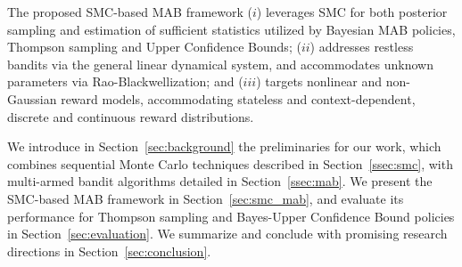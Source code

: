 The proposed SMC-based MAB framework 
($i$) leverages SMC for both posterior sampling and estimation of sufficient statistics utilized by Bayesian MAB policies,
\ie Thompson sampling and Upper Confidence Bounds; 
($ii$) addresses restless bandits via the general linear dynamical system, and accommodates unknown parameters via Rao-Blackwellization; and
($iii$) targets nonlinear and non-Gaussian reward models,
accommodating stateless and context-dependent, discrete and continuous reward distributions. 

We introduce in Section~\ref{sec:background} the preliminaries for our work,
which combines sequential Monte Carlo techniques described in Section~\ref{ssec:smc},
with multi-armed bandit algorithms detailed in Section~\ref{ssec:mab}.
We present the SMC-based MAB framework in Section~\ref{sec:smc_mab},
and evaluate its performance for Thompson sampling and Bayes-Upper Confidence Bound policies in Section~\ref{sec:evaluation}.
We summarize and conclude with promising research directions in Section~\ref{sec:conclusion}.